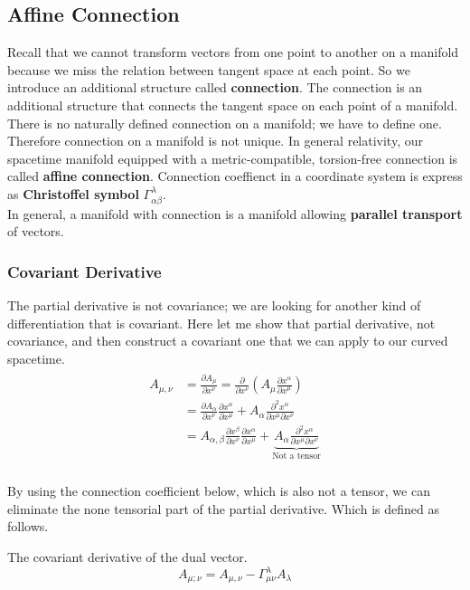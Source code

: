 \documentclass[12pt]{article}
\theoremstyle{mystyle}{\newtheorem{definition}{Definition}[subsection]}
\theoremstyle{mystyle}{\newtheorem{theorem}[definition]{Theorem}}
\theoremstyle{mystyle}{\newtheorem*{remark}{Remark}}
\theoremstyle{mystyle}{\newtheorem{example}{Example}[subsection]}
\theoremstyle{mystyle}{\newtheorem{examples}{Examples}[subsection]}
\theoremstyle{mystyle}{\newtheorem{cthm}{}[subsection]}
\begin{document}
\subsection{Affine Connection}
Recall that we cannot transform vectors from one point to another on a manifold
because we miss the relation between tangent space at each point. So we introduce an additional structure called \textbf{connection}.
The connection is an additional structure that connects the tangent space on each point of a manifold.
There is no naturally defined connection on a manifold; we have to define one. Therefore connection on a manifold is not unique.
In general relativity, our spacetime manifold equipped with a metric-compatible, torsion-free connection is called \textbf{affine connection}.
Connection coeffienct in a coordinate system is express as \textbf{Christoffel symbol} \(\Gamma^{\lambda}_{\alpha\beta}\).\\
In general, a manifold with connection is a manifold allowing \textbf{parallel transport} of vectors.

\subsubsection{Covariant Derivative}
The partial derivative is not covariance; we are looking for another kind of differentiation that is covariant.
Here let me show that partial derivative, not covariance, and then construct a covariant one that we can apply to our curved spacetime.
\begin{align*}
  \begin{split}
    A_{\mu,\nu} &= \frac{\partial A_{\mu}}{\partial x^{\nu}} = \frac{\partial}{\partial x^{\nu}}
    \left( A_{\mu}\frac{\partial x^{\alpha}}{\partial x^{\mu}}\right)\\
    &= \frac{\partial A_\alpha}{\partial x^{\nu}}\frac{\partial x^{\alpha}}{\partial x^{\mu}}+
    A_{\alpha} \frac{\partial^2 x^{\alpha}}{\partial x^{\mu} \partial x^{\nu}}\\
    &= A_{\alpha,\beta}\frac{\partial x^{\beta}}{\partial x^{\nu}}\frac{\partial x^{\alpha}}{\partial x^{\mu}} +
    \underbrace{A_{\alpha} \frac{\partial^2 x^{\alpha}}{\partial x^{\mu} \partial x^{\nu}}}_\text{Not a tensor}
  \end{split}
\end{align*}\\
By using the connection coefficient below, which is also not a tensor, we can eliminate the none tensorial part of the partial derivative.
Which is defined as follows.
\begin{definition}
  The covariant derivative of the dual vector.
  \[A_{\mu;\nu} = A_{\mu,\nu} - \Gamma^{\lambda}_{\mu\nu}A_{\lambda}\]
\end{definition}
\end{document}
